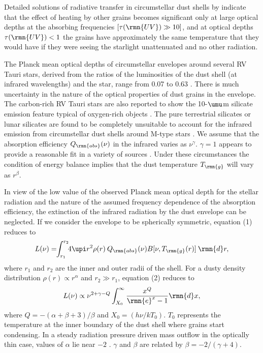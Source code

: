 \documentclass[useAMS,usedcolumn,usegraphicx,usenatbib]{mn2e}
\begin{document}
Detailed solutions of radiative transfer in circumstellar  dust
shells by \citet{b21,b22} indicate that the effect of heating by
other grains becomes significant only at large optical depths at
the absorbing frequencies $[\tau(\rmn{UV})\gg 10]$, and at optical
depths $\tau(\rmn{UV})<1$ the grains have approximately the same
temperature that they would have if they were seeing the starlight
unattenuated and no other radiation.

The Planck mean optical depths of circumstellar envelopes  around
several RV Tauri stars, derived from the ratios of the
luminosities of the dust shell (at infrared wavelengths) and the
star, range from 0.07 to 0.63 \citep{b9}. There is much
uncertainty in the nature of the optical properties of dust grains
in the envelope. The carbon-rich RV Tauri stars are also reported
to show the 10-$\umu$m silicate emission feature typical of
oxygen-rich objects \citep{b6,b19}. The pure terrestrial silicates
or lunar silicates are found to be completely unsuitable to
account for the infrared emission from circumstellar dust shells
around M-type stars \citep{b21}. We assume that the absorption
efficiency $Q_{\rmn{abs}} (\nu)$ in the infrared varies as
$\nu^{\gamma}$. ${\gamma}=1$ appears to provide a reasonable fit
in a variety of sources \citep*{b11,b12}. Under these
circumstances the condition of energy balance implies that the
dust temperature $T_{\rmn{g}}$ will vary as $r^{\beta}$.

In view of the low value of the observed Planck mean  optical depth for
the stellar radiation and the nature of the assumed frequency
dependence of the absorption efficiency, the extinction of the infrared
radiation by the dust envelope can be neglected. If we consider the
envelope to be spherically symmetric, equation (1) reduces to
\begin{equation}
   L(\nu)=\!\!\int_{r_{1}}^{r_{2}}\!\!4\upi r^2\rho(r)\> Q_{\rmn{abs}}(\nu)B[\nu,T_{\rmn{g}}(r)]\> {\rmn{d}}r,
\end{equation}
where $r_1$ and $r_2$ are the inner and outer radii of the shell. For
a dusty density distribution $\rho(r)\propto r^{\alpha}$ and $r_2\gg
r_1$, equation (2) reduces to
\begin{equation}
   L(\nu)\propto \nu^{2+\gamma-Q}\int_{X_0}^{\infty}{{x^Q}\over
   {\rmn{e}^x-1}}\rmn{d}x ,
\end{equation}
where $Q=-(\alpha+\beta+3)/\beta$ and $X_0=(h\nu /kT_0)$. $T_0$
represents the temperature at the inner boundary of the dust shell
where grains start condensing. In a steady radiation pressure
driven mass outflow in the optically thin case, values of $\alpha$
lie near $-2$ \citep{b8}. $\gamma$ and $\beta$ are related by
$\beta=-2/(\gamma+4)$.
\end{document}
